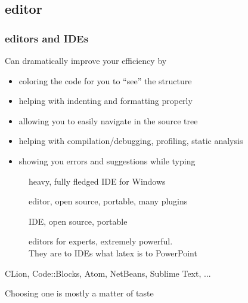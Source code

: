 \subsection[Editor]{\cpp editor}

\begin{frame}[fragile]
  \frametitle{\cpp editors and IDEs}
  \begin{block}{Can dramatically improve your efficiency by}
    \begin{itemize}
      \item coloring the code for you to ``see'' the structure
      \item helping with indenting and formatting properly
      \item allowing you to easily navigate in the source tree
      \item helping with compilation/debugging, profiling, static analysis
      \item showing you errors and suggestions while typing
    \end{itemize}
  \end{block}
  \begin{block}{}
    \begin{description}
    \item[\href{http://www.microsoft.com/}{}]
      heavy, fully fledged IDE for Windows
    \item[\href{https://code.visualstudio.com/}{}]
      editor, open source, portable, many plugins
    \item[\href{https://www.eclipse.org/}{}]
      IDE, open source, portable
    \item[\href{http://www.gnu.org/software/emacs/}{} \href{https://www.vim.org/}{}]
      editors for experts, extremely powerful. \\
      They are to IDEs what latex is to PowerPoint
    \item[CLion, Code::Blocks, Atom, NetBeans, Sublime Text, ...]
    \end{description}
    Choosing one is mostly a matter of taste
  \end{block}
\end{frame}
